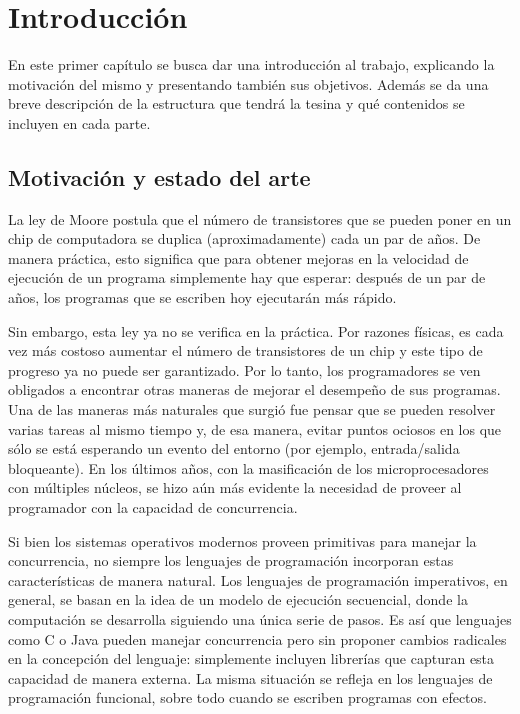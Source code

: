 \chapter{Introducción}

En este primer capítulo se busca dar una introducción al trabajo, explicando la motivación del mismo y presentando también sus objetivos. Además se da una breve descripción de la estructura que tendrá la tesina y qué contenidos se incluyen en cada parte. 

\section{Motivación y estado del arte} 

La ley de Moore postula que el número de transistores que se pueden
poner en un chip de computadora se duplica (aproximadamente) cada un par
de años. De manera práctica, esto significa que para obtener
mejoras en la velocidad de ejecución de un programa simplemente hay
que esperar: después de un par de años, los programas que se escriben
hoy ejecutarán más rápido. 

Sin embargo, esta ley ya no se verifica en la práctica. Por razones físicas, es cada vez más costoso aumentar el número de transistores de
un chip y este tipo de progreso ya no puede ser garantizado. Por lo tanto, los
programadores se ven obligados a encontrar otras maneras de mejorar el
desempeño de sus programas. Una de las maneras más naturales que
surgió fue pensar que se pueden resolver varias tareas al mismo tiempo
y, de esa manera, evitar puntos ociosos en los que sólo se está esperando un evento del
entorno (por ejemplo, entrada/salida bloqueante). En los últimos años, con la
masificación de los microprocesadores con múltiples núcleos, se hizo aún
más evidente la necesidad de proveer al programador con la capacidad
de concurrencia.

Si bien los sistemas operativos modernos proveen primitivas para
manejar la concurrencia, no siempre los lenguajes de programación incorporan estas características de manera natural. Los lenguajes de
programación imperativos, en general, se basan en la idea de un modelo
de ejecución secuencial, donde la computación se desarrolla siguiendo
una única serie de pasos. Es así que lenguajes como C o Java pueden
manejar concurrencia pero sin proponer cambios radicales en la
concepción del lenguaje: simplemente incluyen librerías que capturan esta
capacidad de manera externa. La misma situación se refleja en los lenguajes de programación funcional, sobre todo cuando se escriben programas con
efectos. 

